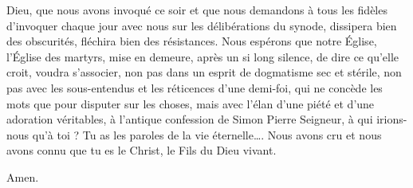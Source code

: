 Dieu, que nous avons invoqué ce soir et que nous demandons à tous les fidèles d’invoquer chaque jour avec nous sur les délibérations du synode, dissipera bien des obscurités, fléchira bien des résistances. Nous espérons que notre Église, l’Église des martyrs, mise en demeure, après un si long silence, de dire ce qu’elle croit, voudra s’associer, non pas dans un esprit de dogmatisme sec et stérile, non pas avec les sous-entendus et les réticences d’une demi-foi, qui ne concède les mots que pour disputer sur les choses, mais avec l’élan d’une piété et d’une adoration véritables, à l’antique confession de Simon Pierre\frcolon{} \Og{} Seigneur, à qui irions-nous qu’à toi ? Tu as les paroles de la vie éternelle…. Nous avons cru et nous avons connu que tu es le Christ, le Fils du Dieu vivant. \Fg{}

\hfill Amen.


\thispagestyle{chapterend}
